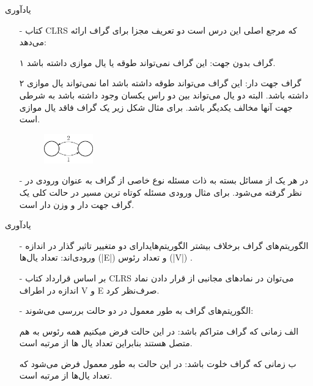 \begin{frame}{يادآوری}
	\begin{itemize}\itemr
		\item[-]
کتاب CLRS که مرجع اصلی این درس است دو تعریف مجزا برای گراف ارائه می‌دهد:
\item[۱]
گراف بدون جهت: این گراف نمی‌تواند طوقه یا یال موازی داشته باشد.
\item[۲]
گراف جهت دار: این گراف می‌تواند طوقه داشته باشد اما نمی‌تواند یال موازی داشته باشد. البته دو یال می‌تواند بین دو راس یکسان وجود داشته باشد به شرطی جهت آنها مخالف یکدیگر باشد. برای مثال شکل زیر یک گراف فاقد یال موازی است.

\begin{figure}[h!]
\centering
\includegraphics[width=0.2\textwidth]{figs/chap02/1.png}
\end{figure}
\item[-]
در هر یک از مسائل بسته به ذات مسئله نوع خاصی از گراف به عنوان ورودی در نظر گرفته می‌شود. برای مثال ورودی مسئله کوتاه ترین مسیر در حالت کلی یک گراف جهت دار و وزن دار است.
\end{itemize}
\end{frame}


\begin{frame}{يادآوری}
	\begin{itemize}\itemr
\item[-]
الگوریتم‌های گراف برخلاف بیشتر الگوریتم‌هایدارای دو متغییر تاثیر گذار در اندازه ورودی‌اند: تعداد یال‌ها (|E|) و تعداد رئوس (|V|) .
\item[-]
بر اساس قرارداد کتاب CLRS می‌توان در نمادهای مجانبی از قرار دادن نماد اندازه در اطراف V و E صرف‌نظر ‌کرد.

\item[-]
الگوریتم‌های گراف به طور معمول در دو حالت بررسی می‌شوند:
\item[الف]
زمانی که گراف متراکم باشد: در این حالت فرض میکنیم همه رئوس به هم متصل هستند بنابراین تعداد یال ها از مرتبه
است.
\item[ب]
زمانی که گراف خلوت باشد:‌ در این حالت به طور معمول فرض می‌شود که تعداد یال‌ها از مرتبه
است.

	\end{itemize}
\end{frame}

